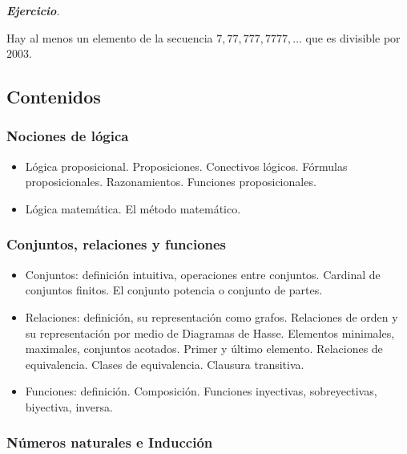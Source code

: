 \documentclass[a4paper,10pt,BCOR10mm,oneside,headsepline]{scrbook}
\begin{document}
\bigskip
\noindent  \textit{\textbf{Ejercicio}}. 

Hay al menos un elemento de la secuencia $7,77,777,7777,\ldots$ que es divisible por $2003$.





\subsection{Contenidos }


\subsubsection{Nociones de lógica}
\begin{itemize}
	\item Lógica proposicional. Proposiciones. Conectivos lógicos. Fórmulas proposicionales. Razonamientos. Funciones proposicionales. 
	
	\item Lógica matemática. El método matemático. 
	
\end{itemize} 

\subsubsection{Conjuntos, relaciones y funciones}

\begin{itemize}
\item Conjuntos: definición intuitiva, operaciones entre conjuntos.   Cardinal de conjuntos finitos.  El conjunto potencia o conjunto de partes. 

\item Relaciones: definición, su representación como grafos.  Relaciones de orden y su representación por medio de Diagramas de Hasse.  Elementos minimales, maximales, conjuntos acotados. Primer y último elemento. Relaciones de equivalencia. Clases de equivalencia.  Clausura transitiva.

\item Funciones: definición. Composición. Funciones inyectivas, sobreyectivas, biyectiva, inversa.

\end{itemize} 
 
\subsubsection{Números naturales e Inducción}
\end{document}
